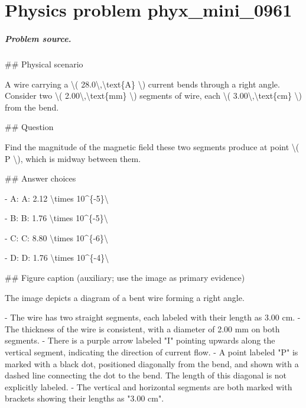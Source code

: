 
\chapter{Physics problem phyx\_mini\_0961}
\label{ch:PhyXMiniProblems_problem_phyx_mini_0961}

\paragraph{Problem source.}
\#\# Physical scenario

A wire carrying a \textbackslash{}( 28.0\textbackslash{},\textbackslash{}text\{A\} \textbackslash{}) current bends through a right angle. Consider two \textbackslash{}( 2.00\textbackslash{},\textbackslash{}text\{mm\} \textbackslash{}) segments of wire, each \textbackslash{}( 3.00\textbackslash{},\textbackslash{}text\{cm\} \textbackslash{}) from the bend.

\#\# Question

Find the magnitude of the magnetic field these two segments produce at point \textbackslash{}( P \textbackslash{}), which is midway between them.

\#\# Answer choices

- A: A: 2.12 \textbackslash{}times 10\textasciicircum{}\{-5\}\textbackslash{}

- B: B: 1.76 \textbackslash{}times 10\textasciicircum{}\{-5\}\textbackslash{}

- C: C: 8.80 \textbackslash{}times 10\textasciicircum{}\{-6\}\textbackslash{}

- D: D: 1.76 \textbackslash{}times 10\textasciicircum{}\{-4\}\textbackslash{}

\#\# Figure caption (auxiliary; use the image as primary evidence)

The image depicts a diagram of a bent wire forming a right angle. 

- The wire has two straight segments, each labeled with their length as 3.00 cm. 
- The thickness of the wire is consistent, with a diameter of 2.00 mm on both segments.
- There is a purple arrow labeled "I" pointing upwards along the vertical segment, indicating the direction of current flow.
- A point labeled "P" is marked with a black dot, positioned diagonally from the bend, and shown with a dashed line connecting the dot to the bend. The length of this diagonal is not explicitly labeled.
- The vertical and horizontal segments are both marked with brackets showing their lengths as "3.00 cm".

